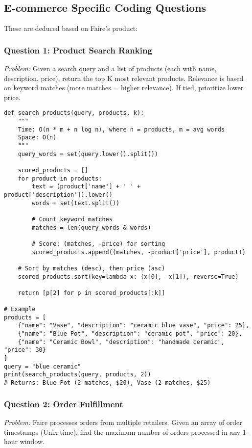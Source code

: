 \documentclass[11pt,letterpaper]{article}
\begin{document}
\subsection{E-commerce Specific Coding Questions}

These are deduced based on Faire's product:

\subsubsection{Question 1: Product Search Ranking}

\textit{Problem:} Given a search query and a list of products (each with name, description, price), return the top K most relevant products. Relevance is based on keyword matches (more matches = higher relevance). If tied, prioritize lower price.

\begin{lstlisting}
def search_products(query, products, k):
    """
    Time: O(n * m + n log n), where n = products, m = avg words
    Space: O(n)
    """
    query_words = set(query.lower().split())

    scored_products = []
    for product in products:
        text = (product['name'] + ' ' + product['description']).lower()
        words = set(text.split())

        # Count keyword matches
        matches = len(query_words & words)

        # Score: (matches, -price) for sorting
        scored_products.append((matches, -product['price'], product))

    # Sort by matches (desc), then price (asc)
    scored_products.sort(key=lambda x: (x[0], -x[1]), reverse=True)

    return [p[2] for p in scored_products[:k]]

# Example
products = [
    {"name": "Vase", "description": "ceramic blue vase", "price": 25},
    {"name": "Blue Pot", "description": "ceramic pot", "price": 20},
    {"name": "Ceramic Bowl", "description": "handmade ceramic", "price": 30}
]
query = "blue ceramic"
print(search_products(query, products, 2))
# Returns: Blue Pot (2 matches, $20), Vase (2 matches, $25)
\end{lstlisting}

\subsubsection{Question 2: Order Fulfillment}

\textit{Problem:} Faire processes orders from multiple retailers. Given an array of order timestamps (Unix time), find the maximum number of orders processed in any 1-hour window.
\end{document}
